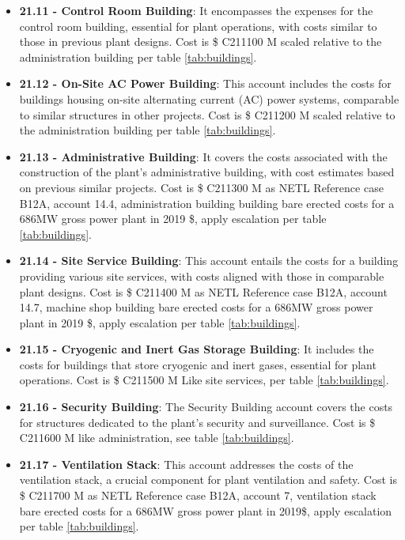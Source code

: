 \begin{itemize}
\item \textbf{21.11 - Control Room Building}: It encompasses the expenses for the control room building, essential for plant operations, with costs similar to those in previous plant designs.  Cost is \$ C211100 M scaled relative to the administration building per table \ref{tab:buildings}. 
\item \textbf{21.12 - On-Site AC Power Building}: This account includes the costs for buildings housing on-site alternating current (AC) power systems, comparable to similar structures in other projects.  Cost is \$ C211200 M scaled relative to the administration building per table \ref{tab:buildings}. 
\item \textbf{21.13 - Administrative Building}: It covers the costs associated with the construction of the plant’s administrative building, with cost estimates based on previous similar projects. Cost is \$ C211300 M as NETL Reference case B12A, account 14.4, administration building building bare erected costs for a 686MW gross power plant in 2019 \$, apply escalation per table \ref{tab:buildings}. 
\item \textbf{21.14 - Site Service Building}: This account entails the costs for a building providing various site services, with costs aligned with those in comparable plant designs. Cost is \$ C211400 M as NETL Reference case B12A, account 14.7, machine shop building bare erected costs for a 686MW gross power plant in 2019 \$, apply escalation per table \ref{tab:buildings}. 
\item \textbf{21.15 - Cryogenic and Inert Gas Storage Building}: It includes the costs for buildings that store cryogenic and inert gases, essential for plant operations.  Cost is \$ C211500 M Like site services, per table \ref{tab:buildings}. 
\item \textbf{21.16 - Security Building}: The Security Building account covers the costs for structures dedicated to the plant’s security and surveillance. Cost is \$ C211600 M like administration, see table \ref{tab:buildings}. 
\item \textbf{21.17 - Ventilation Stack}: This account addresses the costs of the ventilation stack, a crucial component for plant ventilation and safety. Cost is \$ C211700 M as NETL Reference case B12A, account 7, ventilation stack bare erected costs for a 686MW gross power plant in 2019\$, apply escalation per table \ref{tab:buildings}.
\end{itemize}









